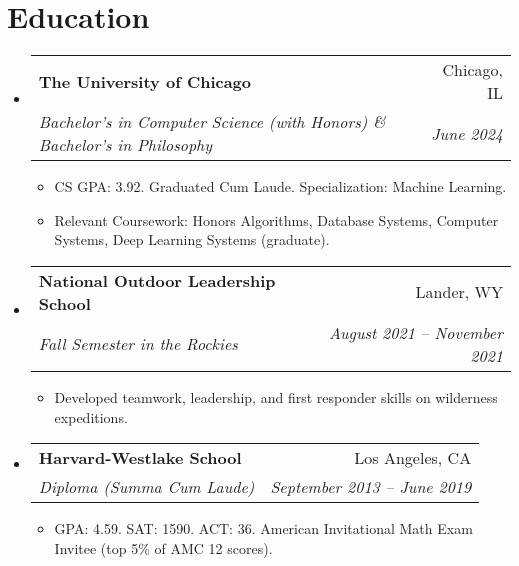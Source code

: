 \documentclass[letterpaper,11pt]{article}
\makeatletter
\newcommand{\resumeItem}[1]{
  \item\small{
    {#1 \vspace{-2pt}}
  }
}
\newcommand{\resumeSubheading}[4]{
  \vspace{-2pt}\item
    \begin{tabular*}{0.97\textwidth}[t]{l@{\extracolsep{\fill}}r}
      \textbf{#1} & #2 \\
      \textit{\small#3} & \textit{\small #4} \\
    \end{tabular*}\vspace{-7pt}
}
\newcommand{\resumeSubHeadingListStart}{\begin{itemize}[leftmargin=0.125in, label={}]}
\newcommand{\resumeSubHeadingListEnd}{\end{itemize}}
\newcommand{\resumeItemListStart}{\begin{itemize}[leftmargin=0.185in]
}
\newcommand{\resumeItemListEnd}{\end{itemize}\vspace{-5pt}}
\makeatother
\begin{document}
\section{Education}
  \resumeSubHeadingListStart
    \resumeSubheading
      {The University of Chicago}{Chicago, IL}
      {Bachelor's in Computer Science (with Honors) \& Bachelor's in Philosophy}{June 2024}
      \resumeItemListStart
        \resumeItem{CS GPA: 3.92. Graduated Cum Laude. Specialization: Machine Learning.}
        \resumeItem{{Relevant Coursework:} 
        Honors Algorithms,
        Database Systems,
        Computer Systems,
        Deep Learning Systems (graduate).}
      \resumeItemListEnd

    \resumeSubheading
      {National Outdoor Leadership School}{Lander, WY}
      {Fall Semester in the Rockies}{August 2021 -- November 2021}
      \resumeItemListStart
        \resumeItem{Developed teamwork, leadership, and first responder skills on wilderness expeditions.}
      \resumeItemListEnd
      
    \resumeSubheading
      {Harvard-Westlake School}{Los Angeles, CA}
      {Diploma (Summa Cum Laude)}{September 2013 -- June 2019}
      \resumeItemListStart
        \resumeItem{GPA: 4.59. SAT: 1590. ACT: 36. American Invitational Math Exam Invitee (top 5\% of AMC 12 scores).}
      \resumeItemListEnd
      
  \resumeSubHeadingListEnd
\end{document}
